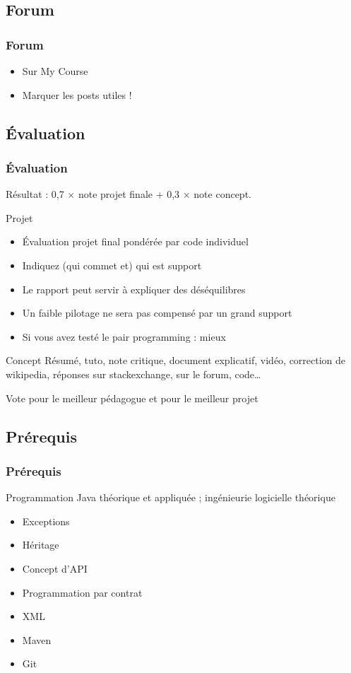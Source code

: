 \documentclass[english, french]{beamer}
\begin{document}
\subsection{Forum}
\begin{frame}
	\frametitle{Forum}
	\begin{itemize}
		\item Sur My Course
		\item Marquer les posts utiles !
	\end{itemize}
\end{frame}

\subsection{Évaluation}
\begin{frame}
	\frametitle{Évaluation}
	Résultat : 0,7 × note projet finale + 0,3 × note concept.
	\begin{block}{Projet}
		\begin{itemize}
			\item Évaluation projet final pondérée par code individuel
			\item Indiquez (qui commet et) qui est support
			\item Le rapport peut servir à expliquer des déséquilibres
			\item Un faible pilotage ne sera pas compensé par un grand support
			\item Si vous avez testé le pair programming : mieux
		\end{itemize}
	\end{block}
	\begin{block}{Concept}
		Résumé, tuto, note critique, document explicatif, vidéo, correction de wikipedia, réponses sur stackexchange, sur le forum, code…
	\end{block}
	Vote pour le meilleur pédagogue et pour le meilleur projet
\end{frame}

\subsection{Prérequis}
\begin{frame}
	\frametitle{Prérequis}
	Programmation Java théorique et appliquée ; ingénieurie logicielle théorique
	\begin{itemize}
		\item Exceptions
		\item Héritage
		\item Concept d’API
		\item Programmation par contrat
		\item XML
		\item Maven
		\item Git
	\end{itemize}
\end{frame}
\end{document}
